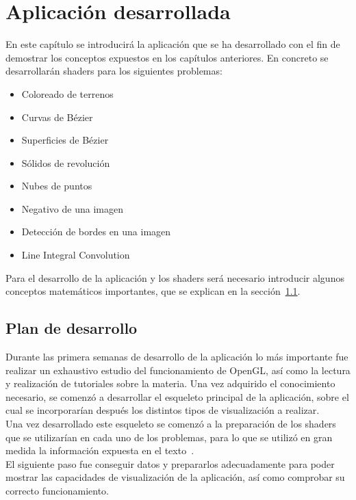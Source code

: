 \cleardoublepage

\chapter{Aplicación desarrollada}
\label{makereference5}

En este capítulo se introducirá la aplicación que se ha desarrollado con el
fin de demostrar los conceptos expuestos en los capítulos anteriores. En
concreto se desarrollarán shaders para los siguientes problemas:

\begin{itemize}
		\item Coloreado de terrenos
		\item Curvas de Bézier
		\item Superficies de Bézier
		\item Sólidos de revolución
		\item Nubes de puntos
		\item Negativo de una imagen
		\item Detección de bordes en una imagen
		\item Line Integral Convolution
\end{itemize}

Para el desarrollo de la aplicación y los shaders será necesario introducir
algunos conceptos matemáticos importantes, que se explican en la
sección~\ref{makereference5.1}.

\section{Plan de desarrollo}
\label{makereference5.1}

Durante las primera semanas de desarrollo de la aplicación lo más importante fue
realizar un exhaustivo estudio del funcionamiento de OpenGL, así como la lectura
y realización de tutoriales sobre la materia. Una vez adquirido el conocimiento
necesario, se comenzó a desarrollar el esqueleto principal de la aplicación,
sobre el cual se incorporarían después los distintos tipos de visualización a
realizar.\\

Una vez desarrollado este esqueleto se comenzó a la preparación de los shaders
que se utilizarían en cada uno de los problemas, para lo que se utilizó en gran
medida la información expuesta en el texto~\citet{Bailey}.\\

El siguiente paso fue conseguir datos y prepararlos adecuadamente para poder
mostrar las capacidades de visualización de la aplicación, así como comprobar su
correcto funcionamiento.\\

